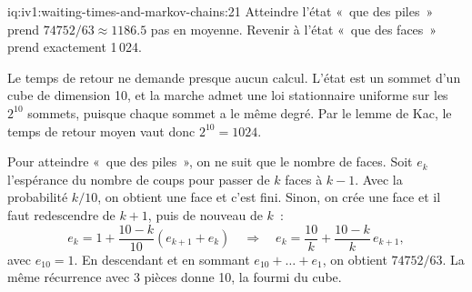 \begin{solution}{iq:iv1:waiting-times-and-markov-chains:21}
Atteindre l'état «~que des piles~» prend $74752/63 \approx 1186.5$ pas en moyenne. Revenir à l'état «~que des faces~» prend exactement 1\,024.

Le temps de retour ne demande presque aucun calcul. L'état est un sommet d'un cube de dimension 10, et la marche admet une loi stationnaire uniforme sur les $2^{10}$ sommets, puisque chaque sommet a le même degré. Par le lemme de Kac, le temps de retour moyen vaut donc $2^{10} = 1024$.

Pour atteindre «~que des piles~», on ne suit que le nombre de faces. Soit $e_k$ l'espérance du nombre de coups pour passer de $k$ faces à $k - 1$. Avec la probabilité $k/10$, on obtient une face et c'est fini. Sinon, on crée une face et il faut redescendre de $k + 1$, puis de nouveau de $k$~:
\[
e_k = 1 + \frac{10 - k}{10}(e_{k+1} + e_k) \quad\Rightarrow\quad e_k = \frac{10}{k} + \frac{10 - k}{k}\,e_{k+1},
\]
avec $e_{10} = 1$. En descendant et en sommant $e_{10} + \dots + e_1$, on obtient $74752/63$. La même récurrence avec 3 pièces donne 10, la fourmi du cube.

\end{solution}

